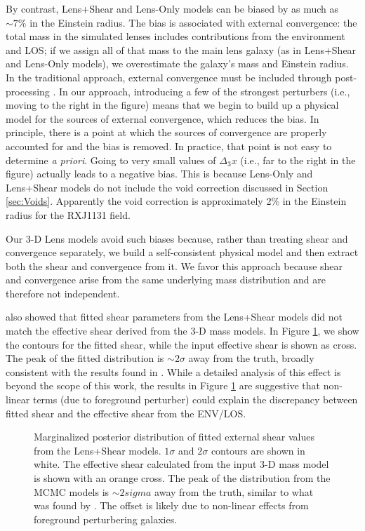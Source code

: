 \documentclass{emulateapj}
\begin{document}
By contrast, Lens+Shear and Lens-Only models can be biased by as much as $\sim 7\%$ in the Einstein radius.  The bias is associated with external convergence: the total mass in the simulated lenses includes contributions from the environment and LOS; if we assign all of that mass to the main lens galaxy (as in Lens+Shear and Lens-Only models), we overestimate the galaxy's mass and Einstein radius.  In the traditional approach, external convergence must be included through post-processing \citep{Collett13, Suyu10}.  In our approach, introducing a few of the strongest perturbers (i.e., moving to the right in the figure) means that we begin to build up a physical model for the sources of external convergence, which reduces the bias.  In principle, there is a point at which the sources of convergence are properly accounted for and the bias is removed.  In practice, that point is not easy to determine \emph{a priori}.  Going to very small values of $\Delta_3 x$ (i.e., far to the right in the figure) actually leads to a negative bias.  This is because Lens-Only and Lens+Shear models do not include the void correction discussed in Section \ref{sec:Voids}.  Apparently the void correction is approximately 2\% in the Einstein radius for the RXJ1131 field.

Our 3-D Lens models avoid such biases because, rather than treating shear and convergence separately, we build a self-consistent physical model and then extract both the shear and convergence from it. We favor this approach because shear and convergence arise from the same underlying mass distribution and are therefore not independent.

\citet{Wong11} also showed that fitted shear parameters from the Lens+Shear models did not match the effective shear derived from the 3-D mass models. In Figure \ref{fig:shear_compare}, we show the contours for the fitted shear, while the input effective shear is shown as cross. The peak of the fitted distribution is $\sim 2\sigma$ away from the truth, broadly consistent with the results found in \citet{Wong11}. While a detailed analysis of this effect is beyond the scope of this work, the results in Figure \ref{fig:shear_compare} are suggestive that non-linear terms (due to foreground perturber) could explain the discrepancy between fitted shear and the effective shear from the ENV/LOS.

\begin{figure}[t]
\centering
\caption{Marginalized posterior distribution of fitted external shear values from the Lens+Shear models. $1\sigma$ and $2\sigma$ contours are shown in white. The effective shear calculated from the input 3-D mass model is shown with an orange cross. The peak of the distribution from the MCMC models is $\sim 2 sigma$ away from the truth, similar to what was found by \citet{Wong11}. The offset is likely due to non-linear effects from foreground perturbering galaxies.}
\label{fig:shear_compare}
\end{figure}
\end{document}

